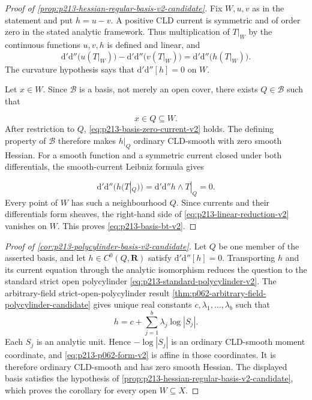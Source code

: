 
\begin{proof}[Proof of
\cref{prop:p213-hessian-regular-basis-v2-candidate}]
Fix \(W,u,v\) as in the statement and put \(h=u-v\). A positive CLD
current is symmetric and of order zero in the stated analytic framework.
Thus multiplication of \(T|_W\) by the continuous functions \(u,v,h\) is
defined and linear, and
\begin{equation}\label{eq:p213-linear-reduction-v2}
 \mathrm d'\mathrm d''\bigl(u(T|_W)\bigr)
 -\mathrm d'\mathrm d''\bigl(v(T|_W)\bigr)
 =\mathrm d'\mathrm d''\bigl(h(T|_W)\bigr).
\end{equation}
The curvature hypothesis says that
\(\mathrm d'\mathrm d''[h]=0\) on \(W\).

Let \(x\in W\). Since \(\mathscr B\) is a basis, not merely an open cover,
there exists \(Q\in\mathscr B\) such that

\[
                           x\in Q\subseteq W.
\]
After restriction to \(Q\), \eqref{eq:p213-basis-zero-current-v2} holds.
The defining property of \(\mathscr B\) therefore makes \(h|_Q\) ordinary
CLD-smooth with zero smooth Hessian. For a smooth function and a symmetric
current closed under both differentials, the smooth-current Leibniz formula
gives

\[
 \mathrm d'\mathrm d''\bigl(h(T|_Q)\bigr)
 =\mathrm d'\mathrm d''h\wedge T|_Q=0.
\]
Every point of \(W\) has such a neighbourhood \(Q\). Since currents and
their differentials form sheaves, the right-hand side of
\eqref{eq:p213-linear-reduction-v2} vanishes on \(W\). This proves
\eqref{eq:p213-basis-bt-v2}.
\end{proof}

\begin{proof}[Proof of
\cref{cor:p213-polycylinder-basis-v2-candidate}]
Let \(Q\) be one member of the asserted basis, and let
\(h\in C^0(Q,\mathbf R)\) satisfy
\(\mathrm d'\mathrm d''[h]=0\). Transporting \(h\) and its current equation
through the analytic isomorphism reduces the question to the standard
strict open polycylinder \eqref{eq:p213-standard-polycylinder-v2}. The
arbitrary-field strict-open-polycylinder result
\cref{thm:p062-arbitrary-field-polycylinder-candidate} gives unique real
constants \(c,\lambda_1,\ldots,\lambda_b\) such that
\begin{equation}\label{eq:p213-p062-form-v2}
                       h=c+\sum_{j=1}^{b}\lambda_j\log|S_j|.
\end{equation}
Each \(S_j\) is an analytic unit. Hence \(-\log|S_j|\) is an ordinary
CLD-smooth moment coordinate, and \eqref{eq:p213-p062-form-v2} is affine in
those coordinates. It is therefore ordinary CLD-smooth and has zero smooth
Hessian. The displayed basis satisfies the hypothesis of
\cref{prop:p213-hessian-regular-basis-v2-candidate}, which proves the
corollary for every open \(W\subseteq X\).
\end{proof}

